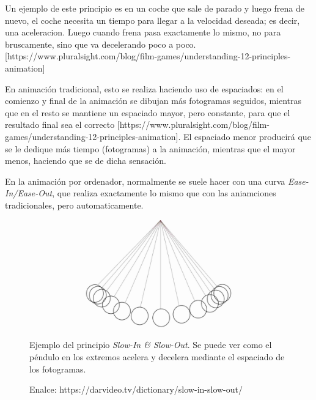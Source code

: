 \documentclass{article}
\begin{document}
\bigskip

Un ejemplo de este principio es en un coche que sale de parado y luego frena de nuevo, el coche necesita un tiempo para llegar a la velocidad deseada; es decir, una aceleracion. Luego cuando frena pasa exactamente lo mismo, no para bruscamente, sino que va decelerando poco a poco. [https://www.pluralsight.com/blog/film-games/understanding-12-principles-animation]

\bigskip

En animación tradicional, esto se realiza haciendo uso de espaciados: en el comienzo y final de la animación se dibujan más fotogramas seguidos, mientras que en el resto se mantiene un espaciado mayor, pero constante, para que el resultado final sea el correcto [https://www.pluralsight.com/blog/film-games/understanding-12-principles-animation]. El espaciado menor producirá que se le dedique más tiempo (fotogramas) a la animación, mientras que el mayor menos, haciendo que se de dicha sensación.

\bigskip

En la animación por ordenador, normalmente se suele hacer con una curva \textit{Ease-In/Ease-Out}, que realiza exactamente lo mismo que con las aniamciones tradicionales, pero automaticamente.

\begin{figure}[H]
    \centering
    \includegraphics[width=\textwidth]{imagenes/Slow-In-and-Slow-Out.jpg}
    \caption{Ejemplo del principio \textit{Slow-In \& Slow-Out}. Se puede ver como el péndulo en los extremos acelera y decelera mediante el espaciado de los fotogramas.}
    \caption{Enalce: https://darvideo.tv/dictionary/slow-in-slow-out/}
\end{figure}
\end{document}
